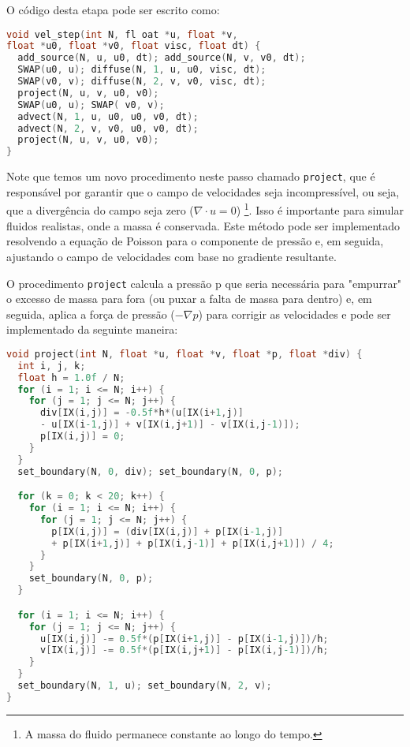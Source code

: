 O código desta etapa pode ser escrito como:

\begin{lstlisting}[language=C]
void vel_step(int N, fl oat *u, float *v, 
float *u0, float *v0, float visc, float dt) {
  add_source(N, u, u0, dt); add_source(N, v, v0, dt);
  SWAP(u0, u); diffuse(N, 1, u, u0, visc, dt);
  SWAP(v0, v); diffuse(N, 2, v, v0, visc, dt);
  project(N, u, v, u0, v0);
  SWAP(u0, u); SWAP( v0, v);
  advect(N, 1, u, u0, u0, v0, dt);
  advect(N, 2, v, v0, u0, v0, dt);
  project(N, u, v, u0, v0);
}
\end{lstlisting}

Note que temos um novo procedimento neste passo chamado \texttt{project}, que é responsável por garantir que o campo de velocidades seja incompressível, ou seja, que a divergência do campo seja zero ($\nabla \cdot u = 0$) \footnote{A massa do fluido permanece constante ao longo do tempo.}. Isso é importante para simular fluidos realistas, onde a massa é conservada. Este método pode ser implementado resolvendo a equação de Poisson para o componente de pressão e, em seguida, ajustando o campo de velocidades com base no gradiente resultante.

O procedimento \texttt{project} calcula a pressão p que seria necessária para "empurrar" o excesso de massa para fora (ou puxar a falta de massa para dentro) e, em seguida, aplica a força de pressão ($-\nabla p$) para corrigir as velocidades e pode ser implementado da seguinte maneira:

\begin{lstlisting}[language=C]
void project(int N, float *u, float *v, float *p, float *div) {
  int i, j, k;
  float h = 1.0f / N;
  for (i = 1; i <= N; i++) {
    for (j = 1; j <= N; j++) {
      div[IX(i,j)] = -0.5f*h*(u[IX(i+1,j)]
      - u[IX(i-1,j)] + v[IX(i,j+1)] - v[IX(i,j-1)]);
      p[IX(i,j)] = 0;
    }
  }
  set_boundary(N, 0, div); set_boundary(N, 0, p);

  for (k = 0; k < 20; k++) {
    for (i = 1; i <= N; i++) {
      for (j = 1; j <= N; j++) {
        p[IX(i,j)] = (div[IX(i,j)] + p[IX(i-1,j)]
        + p[IX(i+1,j)] + p[IX(i,j-1)] + p[IX(i,j+1)]) / 4;
      }
    }
    set_boundary(N, 0, p);
  }

  for (i = 1; i <= N; i++) {
    for (j = 1; j <= N; j++) {
      u[IX(i,j)] -= 0.5f*(p[IX(i+1,j)] - p[IX(i-1,j)])/h;
      v[IX(i,j)] -= 0.5f*(p[IX(i,j+1)] - p[IX(i,j-1)])/h;
    }
  }
  set_boundary(N, 1, u); set_boundary(N, 2, v);
}
\end{lstlisting}

